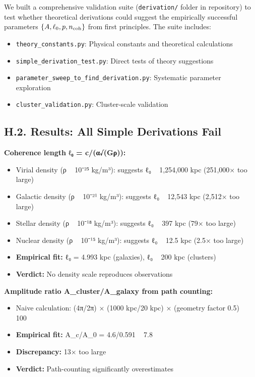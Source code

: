 \documentclass[11pt,a4paper]{article}
\begin{document}
We built a comprehensive validation suite (\texttt{derivation/} folder in repository) to test whether theoretical derivations could suggest the empirically successful parameters $\{A, \ell_0, p, n_{\rm coh}\}$ from first principles. The suite includes:


\begin{itemize}
\item \texttt{theory\_constants.py}: Physical constants and theoretical calculations
\item \texttt{simple\_derivation\_test.py}: Direct tests of theory suggestions
\item \texttt{parameter\_sweep\_to\_find\_derivation.py}: Systematic parameter exploration
\item \texttt{cluster\_validation.py}: Cluster-scale validation
\end{itemize}


\subsection{H.2. Results: All Simple Derivations Fail}


\textbf{Coherence length ℓ₀ = c/(α√(Gρ)):}

\begin{itemize}
\item Virial density (ρ ~ 10⁻²⁵ kg/m³): suggests ℓ₀ ~ 1,254,000 kpc (251,000× too large)
\item Galactic density (ρ ~ 10⁻²¹ kg/m³): suggests ℓ₀ ~ 12,543 kpc (2,512× too large)
\item Stellar density (ρ ~ 10⁻¹⁸ kg/m³): suggests ℓ₀ ~ 397 kpc (79× too large)
\item Nuclear density (ρ ~ 10⁻¹⁵ kg/m³): suggests ℓ₀ ~ 12.5 kpc (2.5× too large)
\item \textbf{Empirical fit:} ℓ₀ = 4.993 kpc (galaxies), ℓ₀ ~ 200 kpc (clusters)
\item \textbf{Verdict:} No density scale reproduces observations
\end{itemize}


\textbf{Amplitude ratio A\_cluster/A\_galaxy from path counting:}

\begin{itemize}
\item Naive calculation: (4π/2π) × (1000 kpc/20 kpc) × (geometry factor 0.5) ~ 100
\item \textbf{Empirical fit:} A\_c/A\_0 = 4.6/0.591 ~ 7.8
\item \textbf{Discrepancy:} 13× too large
\item \textbf{Verdict:} Path-counting significantly overestimates
\end{itemize}
\end{document}
